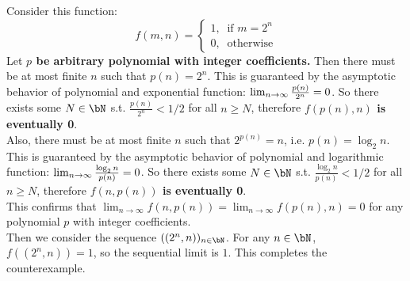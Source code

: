 \documentclass[lang=cn,11pt]{elegantbook}
\begin{document}
\begin{solution}
    Consider this function:
    $$
    f(m,n) =
\begin{cases} 
1, \;\; \text{if } m = 2^n \\ 
0, \;\; \text{otherwise} 
\end{cases}
$$
Let \textbf{$p$ be arbitrary polynomial with integer coefficients.} Then there must be at most finite $n$ such that $p(n) = 2^n$. This is guaranteed by the asymptotic behavior of polynomial and exponential function: $\lim_{n\rightarrow \infty} \frac{p(n)}{2^n} = 0$. So there exists some $N \in \bN$ s.t. $\frac{p(n)}{2^n} < 1/2$ for all $n \geq N$, therefore \textbf{$f(p(n), n)$ is eventually 0}.\\
Also, there must be at most finite $n$ such that $2^{p(n)} = n$, i.e. $p(n) = \log_2 n$. This is guaranteed by the asymptotic behavior of polynomial and logarithmic function: $\lim_{n\rightarrow \infty} \frac{\log_2 n}{p(n)} = 0$. So there exists some $N \in \bN$ s.t. $\frac{\log_2 n}{p(n)} < 1/2$ for all $n \geq N$, therefore \textbf{$f(n, p(n))$ is eventually 0}.\\
This confirms that $\lim_{n \to \infty} f(n, p(n)) = \lim_{n \to \infty} f(p(n), n) = 0$ for any polynomial $p$ with integer coefficients.\\
Then we consider the sequence $((2^n,n))_{n\in \bN}$. For any $n\in\bN$, $f((2^n,n))=1$, so the sequential limit is $1$. This completes the counterexample.
\end{solution}
\end{document}

